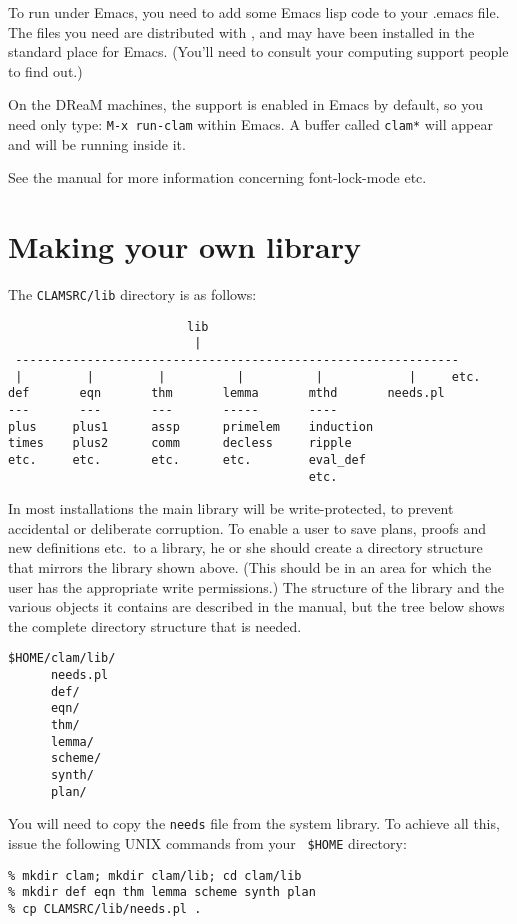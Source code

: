 \documentclass{article}
\begin{document}
To run \clam under Emacs, you need to add some Emacs lisp code to your
.emacs file.  The files you need are distributed with \clam, and
may have been installed in the standard place for Emacs.  (You'll need
to consult your computing support people to find out.)

On the DReaM machines, the support is enabled in Emacs by default, so
you need only type: {\tt M-x run-clam} within Emacs.  A buffer called
{\tt *clam*} will appear and \clam will be running inside it.

See the \clam manual for more information concerning font-lock-mode
etc.


\section{Making your own \clam library\label{make-own-lib}}

The {\tt CLAMSRC/lib} directory is as follows:
%
\begin{verbatim}
                         lib
                          |
 --------------------------------------------------------------
 |         |         |          |          |            |     etc.
def       eqn       thm       lemma       mthd       needs.pl   
---       ---       ---       -----       ----
plus     plus1      assp      primelem    induction
times    plus2      comm      decless     ripple
etc.     etc.       etc.      etc.        eval_def
                                          etc.
\end{verbatim}

In most \clam installations the main library will be write-protected,
to prevent accidental or deliberate corruption.  To enable a user to
save plans, proofs and new definitions etc.\ to a library, he or she
should create a directory structure that mirrors the \clam library
shown above.  (This should be in an area for which the user has the
appropriate write permissions.)  The structure of the \clam library
and the various objects it contains are described in the manual, but
the tree below shows the complete directory structure that is needed.

\begin{verbatim}
$HOME/clam/lib/
      needs.pl
      def/
      eqn/
      thm/
      lemma/
      scheme/
      synth/
      plan/
\end{verbatim}
You will need to copy the {\tt needs} file from the system library.
To achieve all this, issue the following UNIX commands from your {\tt
\$HOME} directory:
\begin{verbatim}
% mkdir clam; mkdir clam/lib; cd clam/lib
% mkdir def eqn thm lemma scheme synth plan
% cp CLAMSRC/lib/needs.pl .
\end{verbatim}
\end{document}
